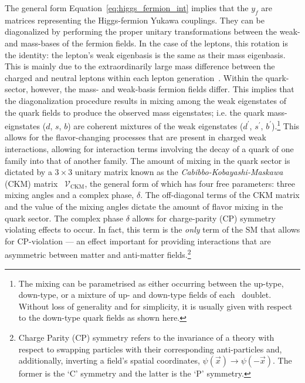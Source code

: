 The general form Equation~\ref{eq:higgs_fermion_int} implies that the $y_f$ are matrices representing the
Higgs-fermion Yukawa couplings. They can be diagonalized by performing the proper unitary
transformations between the weak- and mass-bases of the fermion fields. In the case of the leptons,
this rotation is the identity: the lepton's weak eigenbasis is the same as their mass eigenbasis.
This is mainly due to the extraordinarily large mass difference between the charged and neutral
leptons within each lepton generation~\cite{Akhmedov:2007fk}. Within the quark-sector,  however,
the mass- and weak-basis fermion fields differ. This implies that the diagonalization procedure results
in mixing among the weak eigenstates of the quark fields to produce the observed mass eigenstates; i.e. the quark mass-eignstates ($d$,
$s$, $b$) are
coherent mixtures of the weak eigenstates ($d^{\prime}$,
$s^{\prime}$, $b^{\prime}$).\footnote{The mixing can be parametrised as either occurring between
the up-type, down-type, or a mixture of up- and down-type fields of each \SUtwo~doublet. Without
loss of generality and for simplicity, it is usually given with respect to the down-type quark fields as shown
here.}
This allows for the flavor-changing processes that are present
in charged weak interactions, allowing for interaction terms involving the decay
of a quark of one family into that of another family. The amount of mixing in the quark sector
is dictated by a $3\times 3$ unitary matrix known as the \textit{Cabibbo-Kobayashi-Maskawa} (CKM)
matrix~\cite{Kobayashi:1973fv} $\mathcal{V}_{\text{CKM}}$, the general form of which has four free parameters: three mixing angles
and a complex phase, $\delta$. The off-diagonal terms of the CKM matrix and the value of the mixing angles
dictate the amount of flavor mixing in the quark sector. The complex phase $\delta$
allows for charge-parity (CP) symmetry violating effects to occur. In fact, this term is the \textit{only} term of the SM
that allows for CP-violation --- an effect important for providing interactions that are asymmetric
between matter and anti-matter fields.\footnote{Charge Parity (CP) symmetry refers to the invariance
	of a theory with respect to swapping particles with their corresponding anti-particles and, additionally,
	inverting a field's spatial coordinates, $\psi(\vec{x}) \rightarrow \psi(-\vec{x})$. The former
	is the `C' symmetry and the latter is the `P' symmetry.
}

